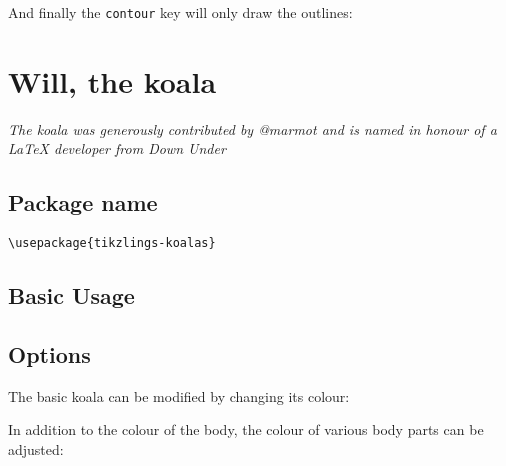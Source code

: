 \documentclass[parskip=half]{scrartcl}
\begin{document}
And finally the \lstinline|contour| key will only draw the outlines:
\begin{tcblisting}{}
\hippo[contour=black]
\end{tcblisting}

%
%
\clearpage
\section[Koala]{Will, the koala}

\emph{The koala was generously contributed by @marmot and is named in honour of a \LaTeX{} developer from Down Under}

\subsection{Package name}

\begin{tcolorbox}[lower separated=false, lefthand width=.8\linewidth]
\vspace*{0.5cm}
\lstinline|\usepackage{tikzlings-koalas}| 
\vspace*{0.5cm}
\end{tcolorbox}

\subsection{Basic Usage}

\begin{tcblisting}{}
\koala
\end{tcblisting}

\subsection{Options}

The basic koala can be modified by changing its colour:
\begin{tcblisting}{}
\koala[body=blue]
\end{tcblisting}

In addition to the colour of the body, the colour of various body parts can be adjusted:
\begin{tcblisting}{}
\koala[eye=red]
\end{tcblisting}
\begin{tcblisting}{}
\koala[mouth=red]
\end{tcblisting}
\end{document}
